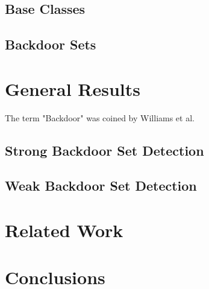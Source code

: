 \documentclass[11pt,a4paper]{article}
\theoremstyle{definition}
\begin{document}
\subsection{Base Classes}

\subsection{Backdoor Sets}

\section{General Results}
The term "Backdoor" was coined by Williams et al. \cite{typicalCaseComplexity}
\label{sec:generalresults}

\subsection{Strong Backdoor Set Detection}

\subsection{Weak Backdoor Set Detection}

\section{Related Work}
\label{sec:relatedwork}

\section{Conclusions}
\label{sec:conclusions}



\end{document}

